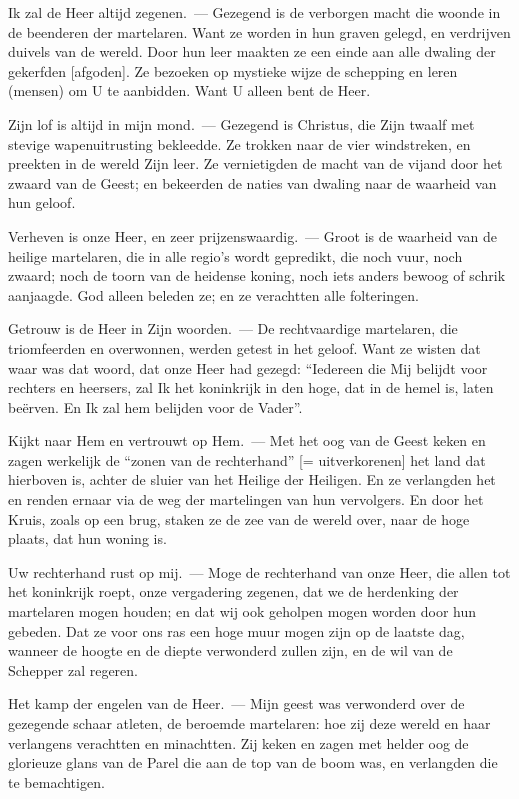 \documentclass[12pt,twoside,a5paper]{article}
\begin{document}
\begin{halfparskip}
   Ik zal de Heer altijd zegenen.~--- Gezegend is de verborgen macht die woonde in de beenderen der martelaren. Want ze worden in hun graven gelegd, en verdrijven duivels van de wereld. Door hun leer maakten ze een einde aan alle dwaling der gekerfden [afgoden]. Ze bezoeken op mystieke wijze de schepping en leren (mensen) om U te aanbidden. Want U alleen bent de Heer.

  Zijn lof is altijd in mijn mond.~--- Gezegend is Christus, die Zijn twaalf met stevige wapenuitrusting bekleedde. Ze trokken naar de vier windstreken, en preekten in de wereld Zijn leer. Ze vernietigden de macht van de vijand door het zwaard van de Geest; en bekeerden de naties van dwaling naar de waarheid van hun geloof.

  Verheven is onze Heer, en zeer prijzenswaardig.~--- Groot is de waarheid van de heilige martelaren, die in alle regio's wordt gepredikt, die noch vuur, noch zwaard; noch de toorn van de heidense koning, noch iets anders bewoog of schrik aanjaagde. God alleen beleden ze; en ze verachtten alle folteringen.

  Getrouw is de Heer in Zijn woorden.~--- De rechtvaardige martelaren, die triomfeerden en overwonnen, werden getest in het geloof. Want ze wisten dat waar was dat woord, dat onze Heer had gezegd: ``Iedereen die Mij belijdt voor rechters en heersers, zal Ik het koninkrijk in den hoge, dat in de hemel is, laten beërven. En Ik zal hem belijden voor de Vader''.

  Kijkt naar Hem en vertrouwt op Hem.~--- Met het oog van de Geest keken en zagen werkelijk de ``zonen van de rechterhand'' [= uitverkorenen] het land dat hierboven is, achter de sluier van het Heilige der Heiligen. En ze verlangden het en renden ernaar via de weg der martelingen van hun vervolgers. En door het Kruis, zoals op een brug, staken ze de zee van de wereld over, naar de hoge plaats, dat hun woning is.

  Uw rechterhand rust op mij.~--- Moge de rechterhand van onze Heer, die allen tot het koninkrijk roept, onze vergadering zegenen, dat we de herdenking der martelaren mogen houden; en dat wij ook geholpen mogen worden door hun gebeden. Dat ze voor ons ras een hoge muur mogen zijn op de laatste dag, wanneer de hoogte en de diepte verwonderd zullen zijn, en de wil van de Schepper zal regeren.

  Het kamp der engelen van de Heer.~--- Mijn geest was verwonderd over de gezegende schaar atleten, de beroemde martelaren: hoe zij deze wereld en haar verlangens verachtten en minachtten. Zij keken en zagen met helder oog de glorieuze glans van de Parel die aan de top van de boom was, en verlangden die te bemachtigen.


\end{halfparskip}
\end{document}
